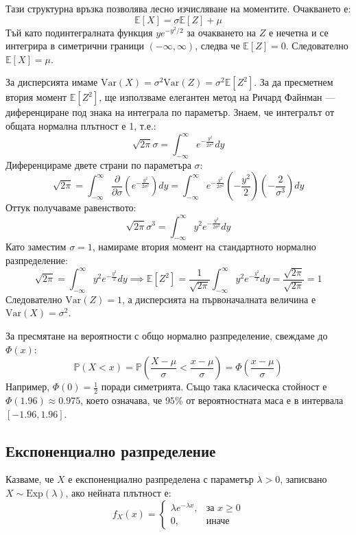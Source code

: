\documentclass{article}
\begin{document}
Тази структурна връзка позволява лесно изчисляване на моментите. Очакването е:
\[
\mathbb{E}[X] = \sigma\mathbb{E}[Z] + \mu
\]
Тъй като подинтегралната функция $y e^{-y^2/2}$ за очакването на $Z$ е нечетна и се интегрира в симетрични граници $(-\infty, \infty)$, следва че $\mathbb{E}[Z] = 0$. Следователно $\mathbb{E}[X] = \mu$.

За дисперсията имаме $\text{Var}(X) = \sigma^2 \text{Var}(Z) = \sigma^2 \mathbb{E}[Z^2]$. За да пресметнем втория момент $\mathbb{E}[Z^2]$, ще използваме елегантен метод на Ричард Файнман — диференциране под знака на интеграла по параметър. 
Знаем, че интегралът от общата нормална плътност е 1, т.е.:
\[
\sqrt{2\pi}\sigma = \int_{-\infty}^{\infty} e^{-\frac{y^2}{2\sigma^2}} dy
\]
Диференцираме двете страни по параметъра $\sigma$:
\[
\sqrt{2\pi} = \int_{-\infty}^{\infty} \frac{\partial}{\partial \sigma} \left( e^{-\frac{y^2}{2\sigma^2}} \right) dy = \int_{-\infty}^{\infty} e^{-\frac{y^2}{2\sigma^2}} \left(-\frac{y^2}{2}\right) \left(-\frac{2}{\sigma^3}\right) dy
\]
Оттук получаваме равенството:
\[
\sqrt{2\pi}\sigma^3 = \int_{-\infty}^{\infty} y^2 e^{-\frac{y^2}{2\sigma^2}} dy
\]
Като заместим $\sigma = 1$, намираме втория момент на стандартното нормално разпределение:
\[
\sqrt{2\pi} = \int_{-\infty}^{\infty} y^2 e^{-\frac{y^2}{2}} dy \implies \mathbb{E}[Z^2] = \frac{1}{\sqrt{2\pi}} \int_{-\infty}^{\infty} y^2 e^{-\frac{y^2}{2}} dy = \frac{\sqrt{2\pi}}{\sqrt{2\pi}} = 1
\]
Следователно $\text{Var}(Z) = 1$, а дисперсията на първоначалната величина е $\text{Var}(X) = \sigma^2$.

За пресмятане на вероятности с общо нормално разпределение, свеждаме до $\Phi(x)$:
\[
\mathbb{P}(X < x) = \mathbb{P}\left(\frac{X-\mu}{\sigma} < \frac{x-\mu}{\sigma}\right) = \Phi\left(\frac{x-\mu}{\sigma}\right)
\]
Например, $\Phi(0) = \frac{1}{2}$ поради симетрията. Също така класическа стойност е $\Phi(1.96) \approx 0.975$, което означава, че $95\%$ от вероятностната маса е в интервала $[-1.96, 1.96]$.

\subsection{Експоненциално разпределение}

Казваме, че $X$ е експоненциално разпределена с параметър $\lambda > 0$, записвано $X \sim \text{Exp}(\lambda)$, ако нейната плътност е:
\[
f_X(x) = 
\begin{cases} 
\lambda e^{-\lambda x}, & \text{за } x \ge 0 \\ 
0, & \text{иначе} 
\end{cases}
\]
\end{document}
